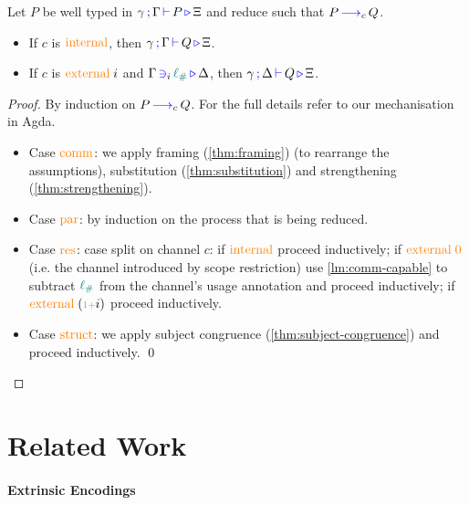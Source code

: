 \documentclass[]{llncs}
\newcommand{\type}[1]{\textcolor{blue}{\operatorname{#1}}}
\newcommand{\constr}[1]{\textcolor{orange}{\operatorname{#1}}}
\newcommand{\func}[1]{\textcolor{teal}{\operatorname{#1}}}
\newcommand{\suc}{\constr{\scriptstyle 1+}}
\newcommand{\lio}{\func{\ell_{\#}}}
\newcommand{\reduce}[1]{\, \type{\longrightarrow}_{#1} \,}
\newcommand{\types}[4]{#1 \, \type{;} \, #2 \, \type{\vdash} \, #3 \, \type{\triangleright} \, #4}
\newcommand{\containsusage}[4]{#1 \, \type{\ni}_{#2} \, #3 \, \type{\triangleright} \, #4}
\begin{document}
\begin{nitheorem}
  \label{thm:subject-reduction}
  Let $P$ be well typed in $\types{\gamma}{\Gamma}{P}{\Xi}$ and reduce such that $P \reduce{c} Q$.
  \begin{itemize}
    \item If $c$ is $\constr{internal}$, then $\types{\gamma}{\Gamma}{Q}{\Xi}$.
    \item If $c$ is $\constr{external} \; i$ and $\containsusage{\Gamma}{i}{\lio}{\Delta}$, then $\types{\gamma}{\Delta}{Q}{\Xi}$.
  \end{itemize}
\end{nitheorem}

\begin{proof}[Proof]
  By induction on $P \reduce{c} Q$. For the full details refer to our mechanisation in Agda.  
  \begin{itemize}
    \item
    Case $\constr{comm}$: we apply framing (\autoref{thm:framing}) (to rearrange the assumptions), substitution (\autoref{thm:substitution}) and strengthening (\autoref{thm:strengthening}).
  
    \item
    Case $\constr{par}$: by induction on the process that is being reduced.

    \item
    Case $\constr{res}$: case split on channel $c$:
    if $\constr{internal}$ proceed inductively;
    if $\constr{external}\; \constr{0}$ (i.e. the channel introduced by scope restriction) use \autoref{lm:comm-capable} to subtract $\lio$ from the channel's usage annotation and proceed inductively;
    if $\constr{external}\; (\suc i)$ proceed inductively.

    \item
    Case $\constr{struct}$: we apply subject congruence (\autoref{thm:subject-congruence}) and proceed inductively. \qed
  \end{itemize}
\end{proof}

\section{Related Work}

\paragraph*{Extrinsic Encodings}
\end{document}
